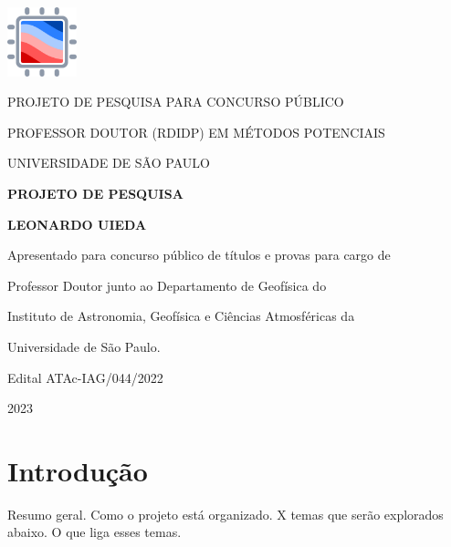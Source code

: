 \documentclass[11pt,a4paper,oneside]{book}
\newcommand{\Year}{2023}
\newcommand{\Author}{Leonardo Uieda}
\begin{document}
\pagestyle{plain}
\frontmatter

\begin{titlepage}
  \begin{center}
    \includegraphics[height=2cm]{images/logo.pdf}
    \vspace{1cm}

    PROJETO DE PESQUISA PARA CONCURSO PÚBLICO

    PROFESSOR DOUTOR (RDIDP) EM MÉTODOS POTENCIAIS

    UNIVERSIDADE DE SÃO PAULO
    \vspace{5cm}

    \textbf{\LARGE PROJETO DE PESQUISA}
    \vspace{1cm}

    \textbf{\LARGE \MakeUppercase{\Author{}}}
    \vspace{5cm}

    {\small
      Apresentado para concurso público de títulos e provas para cargo de

      Professor Doutor junto ao Departamento de Geofísica do

      Instituto de Astronomia, Geofísica e Ciências Atmosféricas da

      Universidade de São Paulo.
      \vspace{1cm}

      Edital ATAc-IAG/044/2022
    }
    \vfill

    \Year{}
  \end{center}
\end{titlepage}

\tableofcontents

\mainmatter
\pagestyle{fancy}

\chapter{Introdução}

Resumo geral.
Como o projeto está organizado.
X temas que serão explorados abaixo.
O que liga esses temas.
\end{document}
